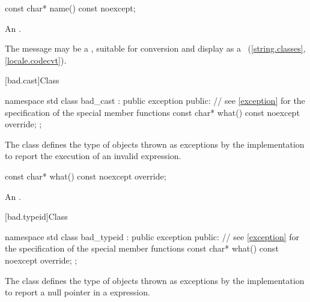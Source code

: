 %
\begin{itemdecl}
const char* name() const noexcept;
\end{itemdecl}

\begin{itemdescr}
\pnum
\returns
An  \ntbs{}.

\pnum
\remarks
The message may be a
,
suitable for conversion and display as a
~(\ref{string.classes}, \ref{locale.codecvt}).
\end{itemdescr}

[bad.cast]{Class }

%
%
\begin{codeblock}
namespace std {
  class bad_cast : public exception {
  public:
    // see \ref{exception} for the specification of the special member functions
    const char* what() const noexcept override;
  };
}
\end{codeblock}

\pnum
The class
defines the type of objects thrown
as exceptions by the implementation to report the execution of an invalid
%
expression.

%
\begin{itemdecl}
const char* what() const noexcept override;
\end{itemdecl}

\begin{itemdescr}
\pnum
\returns
An  \ntbs{}.
\end{itemdescr}

[bad.typeid]{Class }

%
%
\begin{codeblock}
namespace std {
  class bad_typeid : public exception {
  public:
    // see \ref{exception} for the specification of the special member functions
    const char* what() const noexcept override;
  };
}
\end{codeblock}

\pnum
The class
defines the type of objects
thrown as exceptions by the implementation to report a null pointer
in a
expression.

